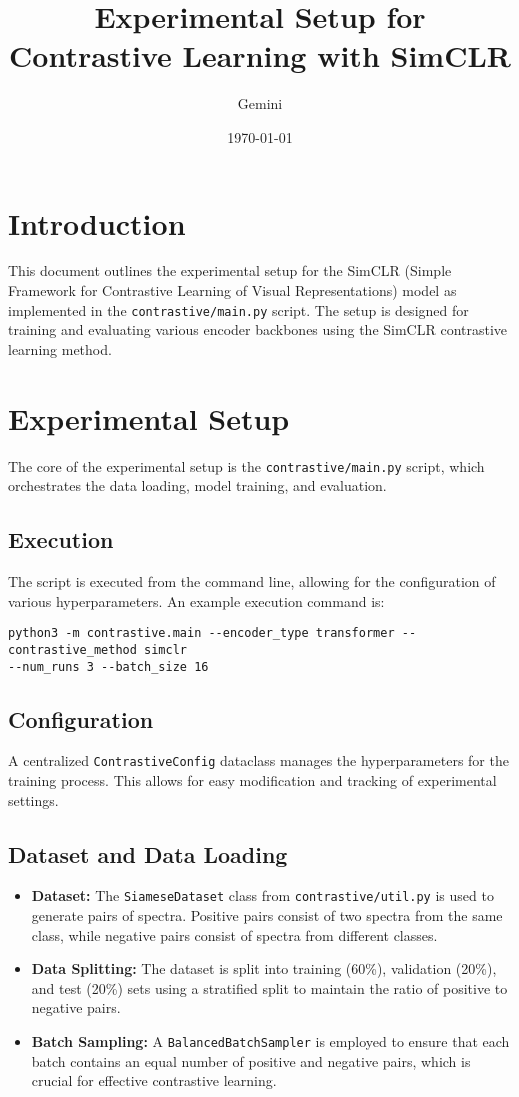 \documentclass{article}
\title{Experimental Setup for Contrastive Learning with SimCLR}
\author{Gemini}
\date{\today}
\begin{document}
\maketitle

\section{Introduction}
This document outlines the experimental setup for the SimCLR (Simple Framework for Contrastive Learning of Visual Representations) model as implemented in the \texttt{contrastive/main.py} script. The setup is designed for training and evaluating various encoder backbones using the SimCLR contrastive learning method.

\section{Experimental Setup}
The core of the experimental setup is the \texttt{contrastive/main.py} script, which orchestrates the data loading, model training, and evaluation.

\subsection{Execution}
The script is executed from the command line, allowing for the configuration of various hyperparameters. An example execution command is:
\begin{verbatim}
python3 -m contrastive.main --encoder_type transformer --contrastive_method simclr 
--num_runs 3 --batch_size 16
\end{verbatim}

\subsection{Configuration}
A centralized \texttt{ContrastiveConfig} dataclass manages the hyperparameters for the training process. This allows for easy modification and tracking of experimental settings.

\subsection{Dataset and Data Loading}
\begin{itemize}
    \item \textbf{Dataset:} The \texttt{SiameseDataset} class from \texttt{contrastive/util.py} is used to generate pairs of spectra. Positive pairs consist of two spectra from the same class, while negative pairs consist of spectra from different classes.
    \item \textbf{Data Splitting:} The dataset is split into training (60\%), validation (20\%), and test (20\%) sets using a stratified split to maintain the ratio of positive to negative pairs.
    \item \textbf{Batch Sampling:} A \texttt{BalancedBatchSampler} is employed to ensure that each batch contains an equal number of positive and negative pairs, which is crucial for effective contrastive learning.
\end{itemize}
\end{document}
